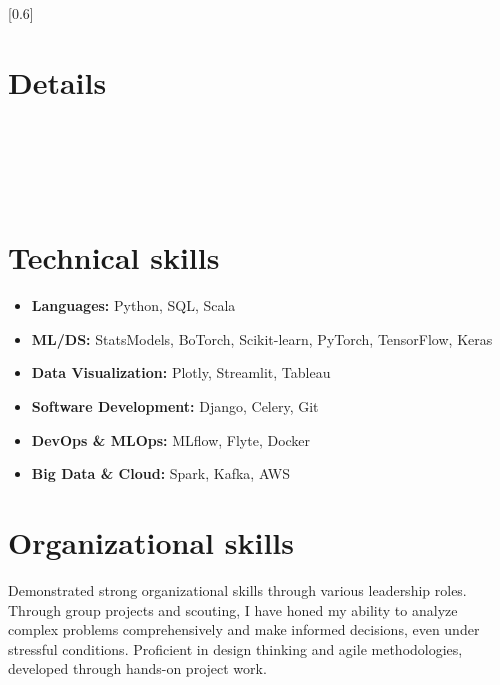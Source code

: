 \documentclass[hipsterpaolo]{simplehipstercv}
\begin{document}
\fontsize{14pt}{14pt}

\thispagestyle{empty}


\setlength{\columnsep}{1.5cm}
[0.6]
\begin{paracol}{2}

\paracolbackgroundoptions

\footnotesize
{
\setfontcolourwhite
\begin{center}
\end{center}

\section*{Details}
\\
\\
\\
\\

\section*{Technical skills}
\begin{itemize}[leftmargin=*]
  \item \textbf{Languages:} Python, SQL, Scala
  \item \textbf{ML/DS:}  StatsModels, BoTorch, Scikit-learn, PyTorch, TensorFlow, Keras
  \item \textbf{Data Visualization:} Plotly, Streamlit, Tableau
  \item \textbf{Software Development:} Django, Celery, Git
  \item \textbf{DevOps \& MLOps:} MLflow, Flyte, Docker
  \item \textbf{Big Data \& Cloud:} Spark, Kafka, AWS
\end{itemize}

\section*{Organizational skills}
Demonstrated strong organizational skills through various leadership roles.
Through group projects and scouting, I have honed my ability to analyze complex problems
comprehensively and make informed decisions, even under stressful conditions.
Proficient in design thinking and agile methodologies, developed through hands-on project work.

}
\end{paracol}
\end{document}
